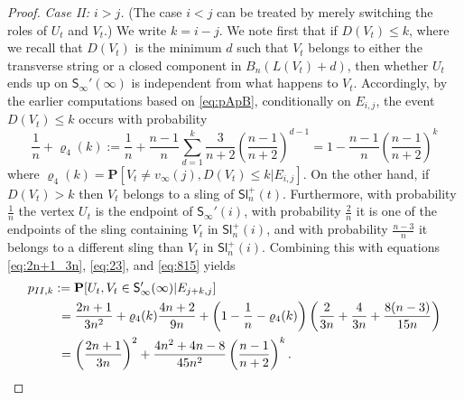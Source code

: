 \documentclass[a4paper,11pt,reqno]{amsart}
\newcommand{\bP}{\mathbf{P}}
\newcommand{\Slr}{\mathsf{Sl}^+}
\newcommand{\Soo}{\mathsf{S}_\infty}
\theoremstyle{definition}
\begin{document}
\begin{proof}
 \emph{Case II: $i>j$.} (The case $i<j$ can be treated by merely switching the roles of $U_t$ and $V_t$.) We write $k=i-j$. We note first that if $D(V_t)\leq k$, where we recall that $D(V_t)$ is the minimum $d$ such that $V_t$ belongs to either the transverse string or a closed component in $B_n(L(V_t)+d)$, then whether $U_t$ ends up on $\Soo'(\infty)$ is independent from what happens to $V_t$. Accordingly, by the earlier computations based on \eqref{eq:pApB}, conditionally on $E_{i,j}$, the event $D(V_t)\leq k$ occurs with probability 
 \[
  \frac{1}{n}+\varrho_4(k):=\frac{1}{n} + \frac{n-1}{n}\sum_{d=1}^k \frac{3}{n+2} \left(\frac{n-1}{n+2}\right)^{d-1} = 1-\frac{n-1}{n}\left(\frac{n-1}{n+2}\right)^k
 \]
 where $\varrho_4(k) = \bP\left[V_t\neq v_\infty(j), D(V_t)\leq k| E_{i,j}\right]$. On the other hand, if $D(V_t)>k$ then $V_t$ belongs to a sling of $\Slr_n(t)$. Furthermore, with probability $\frac{1}{n}$ the vertex $U_t$ is the endpoint of $\Soo'(i)$, with probability $\frac{2}{n}$ it is one of the endpoints of the sling containing $V_t$ in $\Slr_n(i)$, and with probability $\frac{n-3}{n}$ it belongs to a different sling than $V_t$ in $\Slr_n(i)$. Combining this with equations \eqref{eq:2n+1_3n}, \eqref{eq:23}, and \eqref{eq:815} yields 
 \begin{align}\label{eq:p_II}
  p_{II,k}&:=\bP[U_t,V_t\in\Soo'(\infty)|E_{j+k,j}]\notag \\
   &\ = \frac{2n+1}{3n^2} + \varrho_4(k)\frac{4n+2}{9n} + \left(1-\frac{1}{n}-\varrho_4(k)\right)\left(\frac{2}{3n} + \frac{4}{3n} + \frac{8(n-3)}{15n}\right) \notag \\
   &\ = \left(\frac{2n+1}{3n}\right)^2 + \frac{4n^2 +4n-8}{45n^2}\left(\frac{n-1}{n+2}\right)^k.
 \end{align}
 

\end{proof}
\end{document}
